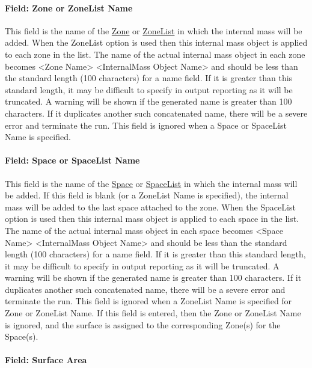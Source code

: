 \paragraph{Field: Zone or ZoneList Name}\label{field-zone-or-zonelist-name-14}

This field is the name of the \hyperref[zone]{Zone} or \hyperref[zonelist]{ZoneList} in which the internal mass will be added. When the ZoneList option is used then this internal mass object is applied to each zone in the list. The name of the actual internal mass object in each zone becomes <Zone Name> <InternalMass Object Name> and should be less than the standard length (100 characters) for a name field. If it is greater than this standard length, it may be difficult to specify in output reporting as it will be truncated. A warning will be shown if the generated name is greater than 100 characters. If it duplicates another such concatenated name, there will be a severe error and terminate the run. This field is ignored when a Space or SpaceList Name is specified.

\paragraph{Field: Space or SpaceList Name}\label{field-space-or-spacelist-name-14}

This field is the name of the \hyperref[space]{Space} or \hyperref[spacelist]{SpaceList} in which the internal mass will be added. If this field is blank (or a ZoneList Name is specified), the internal mass will be added to the last space attached to the zone. When the SpaceList option is used then this internal mass object is applied to each space in the list. The name of the actual internal mass object in each space becomes <Space Name> <InternalMass Object Name> and should be less than the standard length (100 characters) for a name field. If it is greater than this standard length, it may be difficult to specify in output reporting as it will be truncated. A warning will be shown if the generated name is greater than 100 characters. If it duplicates another such concatenated name, there will be a severe error and terminate the run. This field is ignored when a ZoneList Name is specified for Zone or ZoneList Name. If this field is entered, then the Zone or ZoneList Name is ignored, and the surface is assigned to the corresponding Zone(s) for the Space(s).

\paragraph{Field: Surface Area}\label{field-surface-area}

